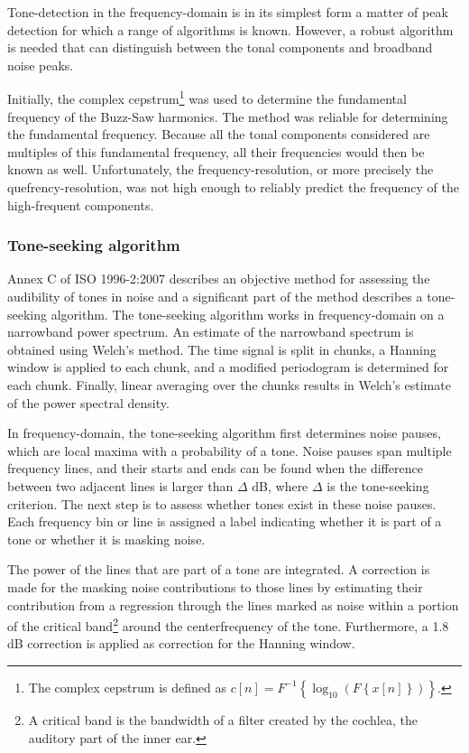 \documentclass[10pt,twocolumn]{article}
\begin{document}
Tone-detection in the frequency-domain is in its simplest form a matter of peak
detection for which a range of algorithms is known. However, a robust algorithm
is needed that can distinguish between the tonal components and broadband noise
peaks.

Initially, the complex cepstrum\footnote{The complex cepstrum is defined as
$c[n] = F^{-1}\left\{\log_{10}{\left( F \left\{x[n]\right\} \right)}\right\}$.}
was used to determine the fundamental frequency of the Buzz-Saw harmonics.
The method was reliable for determining the
fundamental frequency. Because all the tonal components considered are multiples
of this fundamental frequency, all their frequencies would then be known as
well. Unfortunately, the frequency-resolution, or more precisely the
quefrency-resolution, was not high enough to reliably predict the frequency of
the high-frequent components.

\subsubsection{Tone-seeking algorithm}
Annex C of ISO 1996-2:2007 \cite{ISO1996-2_2007} describes an objective method
for assessing the audibility of tones in noise and a significant part of the
method describes a tone-seeking algorithm. The tone-seeking algorithm works in
frequency-domain on a narrowband power spectrum. An estimate of the narrowband
spectrum is obtained using Welch's method. The time signal is split in chunks, a
Hanning window is applied to each chunk, and a modified periodogram is determined for
each chunk. Finally, linear averaging over the chunks results in Welch's
estimate of the power spectral density.

In frequency-domain, the tone-seeking algorithm first determines noise pauses,
which are local maxima with a probability of a tone. Noise pauses span multiple
frequency lines, and their starts and ends can be found when the difference
between two adjacent lines is larger than $\Delta$ dB, where $\Delta$ is the
tone-seeking criterion. The next step is to assess whether tones exist in these
noise pauses. Each frequency bin or line is assigned a label indicating whether
it is part of a tone or whether it is masking noise.

The power of the lines that are part of a tone are integrated. A correction is
made for the masking noise contributions to those lines by estimating their
contribution from a regression through the lines marked as noise within a
portion of the critical band\footnote{A critical band is the bandwidth of a
filter created by the cochlea, the auditory part of the inner ear.} around the
centerfrequency of the tone. Furthermore, a 1.8 dB correction is applied as
correction for the Hanning window.
\end{document}

